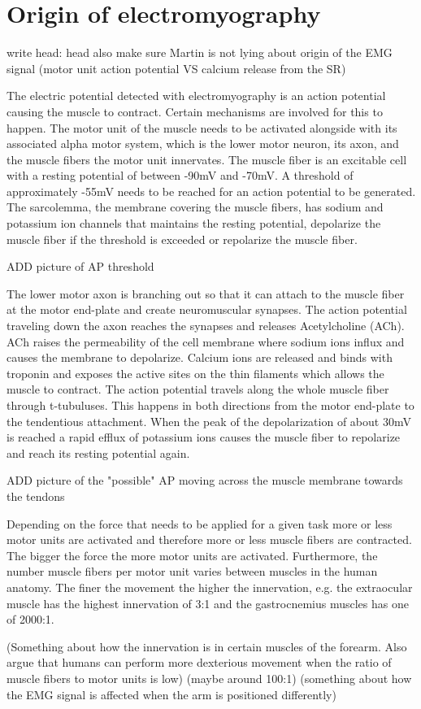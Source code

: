 \section{Origin of electromyography}

write head: head
also make sure Martin is not lying about origin of the EMG signal (motor unit action potential VS calcium release from the SR)

The electric potential detected with electromyography is an action potential causing the muscle to contract. Certain mechanisms are involved for this to happen. The motor unit of the muscle needs to be activated alongside with its associated alpha motor system, which is the lower motor neuron, its axon, and the muscle fibers the motor unit innervates. The muscle fiber is an excitable cell with a resting potential of between -90mV and -70mV. A threshold of approximately -55mV needs to be reached for an action potential to be generated. The sarcolemma, the membrane covering the muscle fibers, has sodium and potassium ion channels that maintains the resting potential, depolarize the muscle fiber if the threshold is exceeded or repolarize the muscle fiber. \cite{cram2012}

ADD picture of AP threshold

The lower motor axon is branching out so that it can attach to the muscle fiber at the motor end-plate and create neuromuscular synapses. The action potential traveling down the axon reaches the synapses and releases Acetylcholine (ACh). ACh raises the permeability of the cell membrane where sodium ions influx and causes the membrane to depolarize. Calcium ions are released and binds with troponin and exposes the active sites on the thin filaments which allows the muscle to contract. The action potential travels along the whole muscle fiber through t-tubuluses. This happens in both directions from the motor end-plate to the tendentious attachment. When the peak of the depolarization of about 30mV is reached a rapid efflux of potassium ions causes the muscle fiber to repolarize and reach its resting potential again. \cite{cram2012}

ADD picture of the "possible" AP moving across the muscle membrane towards the tendons

Depending on the force that needs to be applied for a given task more or less motor units are activated and therefore more or less muscle fibers are contracted. The bigger the force the more motor units are activated. Furthermore, the number muscle fibers per motor unit varies between muscles in the human anatomy. The finer the movement the higher the innervation, e.g. the extraocular muscle has the highest innervation of 3:1 and the gastrocnemius muscles has one of 2000:1. \cite{cram2012}

(Something about how the innervation is in certain muscles of the forearm. Also argue that humans can perform more dexterious movement when the ratio of muscle fibers to motor units is low) (maybe around 100:1)
(something about how the EMG signal is affected when the arm is positioned differently)
